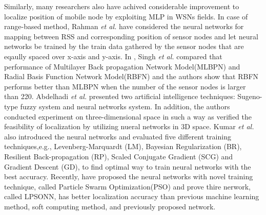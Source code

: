 \documentclass{ieeeaccess}
\begin{document}
Similarly, many researchers also have achived considerable improvement to localize position of mobile node by exploiting MLP in WSNs fields\cite{shareef2008localization, rahman2009localization, singh2013tdoa,abdelhadi2013efficient,bernas2015fully, kumar2016localization, banihashemian2018new}. In case of range-based method, Rahman \textit{et al.} \cite{rahman2009localization} have considered the neural networks for mapping between RSS and corresponding position of sensor nodes and let neural networks be trained by the train data gathered by the sensor nodes that are eqaully spaced over x-axis and y-axis. In \cite{singh2013tdoa}, Singh \textit{et al.} compared that performance of Multilayer Back propagation Network Model(MLBPN) and Radial Basis Function Network Model(RBFN) and the authors show that RBFN performs better than MLBPN when the number of the sensor nodes is larger than 220. Abdelhadi \textit{et al.}  \cite{abdelhadi2013efficient} presented two artificial intelligence techniques: Sugeno-type fuzzy system and neural networks system. In addition, the authors conducted experiment on three-dimensional space in such a way as verified the feasibility of localization by utilizing nueral networks in 3D space. Kumar \textit{et al.} \cite{kumar2016localization} also introduced the neural networks and evaluated five different training techniques,e.g., Levenberg-Marquardt (LM), Bayesian Regularization
(BR), Resilient Back-propagation (RP), Scaled Conjugate Gradient (SCG) and Gradient
Descent (GD), to find optimal way to train neural networks with the best accuracy. Recently, \cite{banihashemian2018new} have proposed the neural networks with novel training technique, called Particle Swarm Optimization(PSO) and prove thire nerwork, called LPSONN, has better localization accuracy than previous machine learning method, soft computing method, and previously proposed network.
\end{document}
